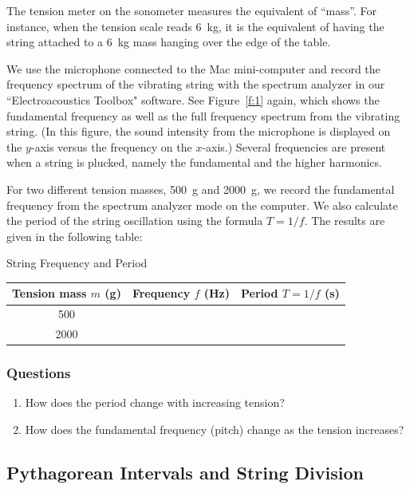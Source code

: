 \documentclass[11pt]{NSF}
\def\ben{\begin{enumerate}}
\def\een{\end{enumerate}}
\def\i{\item{}}
\begin{document}
The tension meter on the sonometer measures the equivalent of ``mass”. 
For instance, when the tension scale reads 6~kg, it is the equivalent 
of having the string attached to a 6~kg mass hanging over the edge 
of the table.

We use the microphone connected to the Mac mini-computer and 
record the frequency spectrum of the vibrating string with the 
spectrum analyzer in our ``Electroacoustics Toolbox" software. 
See Figure~\ref{f:1} again, which shows the fundamental frequency 
as well as the full frequency spectrum from the vibrating string. 
(In this figure, the sound intensity from the microphone is
displayed on the $y$-axis versus the frequency on the $x$-axis.) 
Several frequencies are present when a string is plucked, namely 
the fundamental and the higher harmonics.

For two different tension masses, 500~g and 2000~g, we record the 
fundamental frequency from the spectrum analyzer mode on the computer.
We also calculate the period of the string oscillation using the 
formula $T= 1/f$.
The results are given in the following table:
%
\begin{table}[hbtp]
\begin{center}
String Frequency and Period\\
\begin{tabular}{| c | c | c | }
\hline
Tension mass $m$ (g) & Frequency $f$ (Hz) & Period $T=1/f$ (s) \\
\hline
500 &  &  \\
\hline
2000 &  &  \\
\hline
\end{tabular}
\label{t:3}
\end{center}
\end{table}
%
\subsubsection*{Questions}
%
\ben
\i How does the period change with increasing tension? 

\i How does the fundamental frequency (pitch) change as the tension 
increases?
\een

\subsection{Pythagorean Intervals and String Division}
\end{document}
